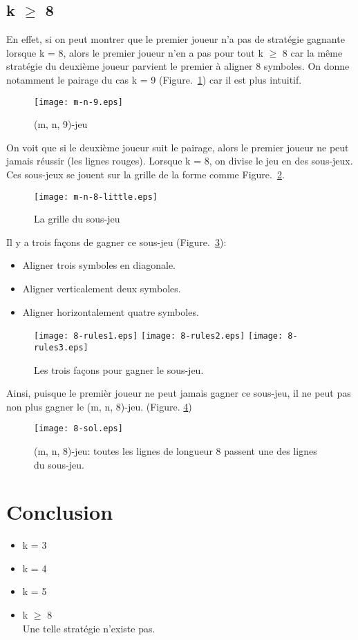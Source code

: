 \documentclass[12pt, a4paper]{article}
\begin{document}
\subsection{k $\ge$ 8}
En effet, si on peut montrer que le premier joueur n'a pas de stratégie gagnante lorsque k = 8, alors le premier joueur n'en a pas pour tout k $\ge$ 8 car la même stratégie du deuxième joueur parvient le premier à aligner 8 symboles. On donne notamment le pairage du cas k = 9 \mbox{(Figure. \ref{fig:m-n-9})} car il est plus intuitif.
\begin{figure}[h!]
    \centering
    \texttt{[image: m-n-9.eps]}
    \caption{(m, n, 9)-jeu}
    \label{fig:m-n-9}
\end{figure}
On voit que si le deuxième joueur suit le pairage, alors le premier joueur ne peut jamais réussir (les lignes rouges).\newpage
Lorsque k = 8, on divise le jeu en des sous-jeux. Ces sous-jeux se jouent sur la grille de la forme comme \mbox{Figure. \ref{fig:sous-jeu}.}
\begin{figure}[h!]
    \centering
    \texttt{[image: m-n-8-little.eps]}
    \caption{La grille du sous-jeu}
    \label{fig:sous-jeu}
\end{figure}
Il y a trois façons de gagner ce sous-jeu \mbox{(Figure. \ref{fig:regle}):}
\begin{itemize}
    \item Aligner trois symboles en diagonale.
    \item Aligner verticalement deux symboles.
    \item Aligner horizontalement quatre symboles.
\end{itemize}
\begin{figure}[h!]
    \centering
    \texttt{[image: 8-rules1.eps]}
    \texttt{[image: 8-rules2.eps]}
    \texttt{[image: 8-rules3.eps]}
    \caption{Les trois façons pour gagner le sous-jeu.}
    \label{fig:regle}
\end{figure}
Ainsi, puisque le premièr joueur ne peut jamais gagner ce sous-jeu, il ne peut pas non plus gagner le (m, n, 8)-jeu. (Figure. \ref{fig:m-n-8})
\begin{figure}[h!]
    \centering
    \texttt{[image: 8-sol.eps]}
    \caption{(m, n, 8)-jeu:
    toutes les lignes de longueur 8 passent une des lignes du sous-jeu.}
    \label{fig:m-n-8}
\end{figure}
\section{Conclusion}

\begin{itemize}
    \item k = 3
    \item k = 4
    \item k = 5
    \item k $\ge$ 8\\
        Une telle stratégie n'existe pas.
\end{itemize}
\end{document}
